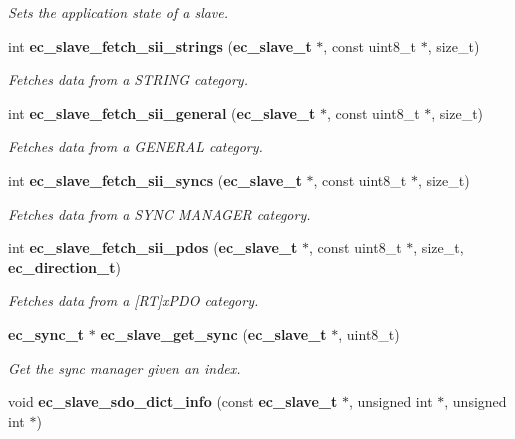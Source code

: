 \begin{DoxyCompactItemize}
\begin{DoxyCompactList}\small\item\em Sets the application state of a slave. \end{DoxyCompactList}\item 
int {\bf ec\-\_\-slave\-\_\-fetch\-\_\-sii\-\_\-strings} ({\bf ec\-\_\-slave\-\_\-t} $\ast$, const uint8\-\_\-t $\ast$, size\-\_\-t)
\begin{DoxyCompactList}\small\item\em Fetches data from a S\-T\-R\-I\-N\-G category. \end{DoxyCompactList}\item 
int {\bf ec\-\_\-slave\-\_\-fetch\-\_\-sii\-\_\-general} ({\bf ec\-\_\-slave\-\_\-t} $\ast$, const uint8\-\_\-t $\ast$, size\-\_\-t)
\begin{DoxyCompactList}\small\item\em Fetches data from a G\-E\-N\-E\-R\-A\-L category. \end{DoxyCompactList}\item 
int {\bf ec\-\_\-slave\-\_\-fetch\-\_\-sii\-\_\-syncs} ({\bf ec\-\_\-slave\-\_\-t} $\ast$, const uint8\-\_\-t $\ast$, size\-\_\-t)
\begin{DoxyCompactList}\small\item\em Fetches data from a S\-Y\-N\-C M\-A\-N\-A\-G\-E\-R category. \end{DoxyCompactList}\item 
int {\bf ec\-\_\-slave\-\_\-fetch\-\_\-sii\-\_\-pdos} ({\bf ec\-\_\-slave\-\_\-t} $\ast$, const uint8\-\_\-t $\ast$, size\-\_\-t, {\bf ec\-\_\-direction\-\_\-t})
\begin{DoxyCompactList}\small\item\em Fetches data from a [R\-T]x\-P\-D\-O category. \end{DoxyCompactList}\item 
{\bf ec\-\_\-sync\-\_\-t} $\ast$ {\bf ec\-\_\-slave\-\_\-get\-\_\-sync} ({\bf ec\-\_\-slave\-\_\-t} $\ast$, uint8\-\_\-t)
\begin{DoxyCompactList}\small\item\em Get the sync manager given an index. \end{DoxyCompactList}\item 
void {\bf ec\-\_\-slave\-\_\-sdo\-\_\-dict\-\_\-info} (const {\bf ec\-\_\-slave\-\_\-t} $\ast$, unsigned int $\ast$, unsigned int $\ast$)\label{slave_8h_a42809dba180f305491cc16c036c22f0a}


\end{DoxyCompactItemize}
